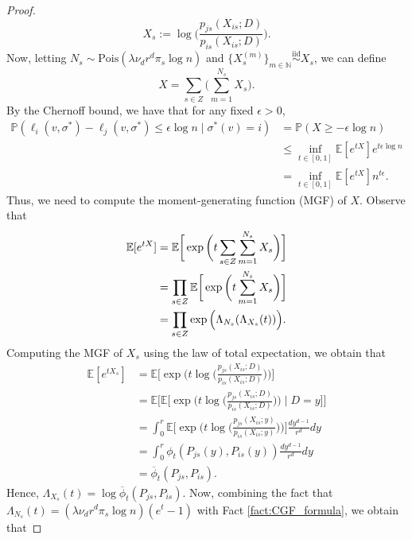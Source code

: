 \documentclass{article}
\renewcommand{\P}{\mathbb{P}}
\newcommand{\E}{\mathbb{E}}
\newcommand{\N}{\mathbb{N}}
\newcommand{\1}{\mathbbm{1}}
\theoremstyle{definition}
\theoremstyle{plain}
\begin{document}
\begin{proof}
    \begin{equation*}
        X_s := \log\bigg( \frac{p_{js}(X_{is} ;D)}{p_{is}(X_{is} ;D)} \bigg).
    \end{equation*}  
    Now, letting $N_s \sim \text{Pois}(\lambda \nu_d r^d \pi_s \log n)$ and $\{X_s^{(m)}\}_{m \in \N} \overset{\text{iid}}{\sim} X_s$, we can define
    \begin{equation*}
        X = \sum_{s \in Z}\bigg( \sum_{m=1}^{N_s} X_s \bigg).
    \end{equation*}
    By the Chernoff bound, we have that for any fixed $\epsilon > 0$,
    \begin{align}
        \P(\ell_i(v, \sigma^*) - \ell_j(v, \sigma^*) \leq \epsilon \log n \mid \sigma^*(v) = i) &= \P(X \geq -\epsilon \log n) \nonumber \\
        &\leq \inf_{t \in [0, 1]} \E[e^{tX}] e^{t\epsilon \log n}  \nonumber \\
        &= \inf_{t \in [0, 1]} \E[e^{tX}]n^{t\epsilon}.     \label{eq:Chernoff_bound_X}
    \end{align}
    Thus, we need to compute the moment-generating function (MGF) of $X$. Observe that
    \begin{align}
    \label{eq:MGF_X}
        \E[e^{tX}] &= \E\bigg[\exp\bigg(t\sum_{s \in Z} \sum_{m=1}^{N_s} X_s\bigg)\bigg] \notag \\
        &= \prod_{s \in Z} \E\bigg[\exp\bigg(t\sum_{m=1}^{N_s} X_s\bigg)\bigg] \notag \\
        &= \prod_{s \in Z} \exp\Big(\Lambda_{N_s}(\Lambda_{X_s}(t))\Big).
    \end{align}
    Computing the MGF of $X_s$ using the law of total expectation, we obtain that
    \begin{align*}
        \E[e^{tX_s}] &= \E\bigg[\exp\bigg(t \log\Big( \frac{p_{js}(X_{is};D)}{p_{is}(X_{is};D)} \Big)\bigg)\bigg] \\
        &= \E\bigg[\E\bigg[\exp\bigg(t \log\Big( \frac{p_{js}(X_{is};D)}{p_{is}(X_{is};D)} \Big)\bigg) \mid D = y\bigg]\bigg] \\
        &= \int_0^r \E\bigg[ \exp\bigg(t \log\Big( \frac{p_{js}(X_{is};y)}{p_{is}(X_{is};y)} \Big)\bigg)\bigg] \frac{dy^{d-1}}{r^d} dy \\
        &= \int_0^r \phi_t(P_{js}(y), P_{is}(y)) \frac{dy^{d-1}}{r^d} dy \\
        &= \overline{\phi}_t(P_{js}, P_{is}).
    \end{align*}
    Hence, $\Lambda_{X_s}(t) = \log \overline{\phi}_t(P_{js}, P_{is})$. Now, combining the fact that $\Lambda_{N_s}(t) = (\lambda \nu_d r^d \pi_s \log n)(e^t - 1)$ with Fact \ref{fact:CGF_formula}, we obtain that

\end{proof}
\end{document}

